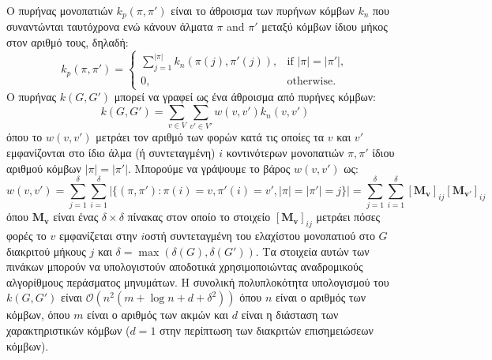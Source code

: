 Ο πυρήνας μονοπατιών $k_p(\pi, \pi')$ είναι το άθροισμα των πυρήνων κόμβων $k_n$ που συναντώνται ταυτόχρονα ενώ κάνουν άλματα $\pi$ and $\pi'$ μεταξύ κόμβων ίδιου μήκος στον αριθμό τους, δηλαδή:
\begin{equation}
    k_p(\pi, \pi') = \begin{cases}
        \sum_{j=1}^{|\pi|} k_n(\pi(j), \pi'(j)), & \text{if $|\pi| = |\pi'|$},\\
        0, & \text{otherwise.} 
        \end{cases}
\end{equation}
Ο πυρήνας $k(G,G')$ μπορεί να γραφεί ως ένα άθροισμα από πυρήνες κόμβων:
\begin{equation}
    k(G,G') = \sum_{v \in V} \sum_{v' \in V'} w(v,v') k_n(v, v')
\end{equation}
όπου το $w(v,v')$ μετράει τον αριθμό των φορών κατά τις οποίες τα $v$ και $v'$ εμφανίζονται στο ίδιο άλμα (ή συντεταγμένη) $i$ κοντινότερων μονοπατιών $\pi,\pi'$ ίδιου αριθμού κόμβων $|\pi| = |\pi'|$.
Μπορούμε να γράψουμε το βάρος $w(v,v')$ ως:
\begin{equation}
    w(v,v') = \sum_{j=1}^\delta \sum_{i=1}^\delta | \{ (\pi,\pi') : \pi(i)=v, \pi'(i)=v', |\pi|=|\pi'|=j \} | = \sum_{j=1}^\delta \sum_{i=1}^\delta [\mathbf{M_v}]_{ij} [\mathbf{M_{v'}}]_{ij}
\end{equation}
όπου $\mathbf{M_v}$ είναι ένας $\delta \times \delta$ πίνακας στον οποίο το στοιχείο $[\mathbf{M_v}]_{ij}$ μετράει πόσες φορές το $v$ εμφανίζεται στην $i$οστή συντεταγμένη του ελαχίστου μονοπατιού στο $G$ διακριτού μήκους $j$ και $\delta = \max(\delta(G), \delta(G'))$.
Τα στοιχεία αυτών των πινάκων μπορούν να υπολογιστούν αποδοτικά χρησιμοποιώντας αναδρομικούς αλγορίθμους περάσματος μηνυμάτων. 
Η συνολική πολυπλοκότητα υπολογισμού του $k(G,G')$ είναι $\mathcal{O}(n^2(m + \log n + d + \delta^2))$ όπου $n$ είναι ο αριθμός των κόμβων, όπου $m$ είναι ο αριθμός των ακμών και $d$ είναι η διάσταση των χαρακτηριστικών κόμβων ($d=1$ στην περίπτωση των διακριτών επισημειώσεων κόμβων).

